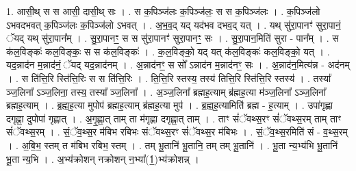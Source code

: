 \documentclass[17pt]{extarticle}
\begin{document}
1. आसी॒थ् स स आसी॒ दासी॒थ् सः । . स क॒पिञ्ज॑लः क॒पिञ्ज॑लः॒ स स क॒पिञ्ज॑लः । . क॒पिञ्ज॑लो ऽभवदभवत् क॒पिञ्ज॑लः क॒पिञ्ज॑लो ऽभवत् । . अ॒भ॒व॒द् यद् यद॑भव दभव॒द् यत् । . यथ् सु॑रा॒पानꣳ॑ सुरा॒पानं॒ ॅयद् यथ् सु॑रा॒पान᳚म् । . सु॒रा॒पानꣳ॒॒ स स सु॑रा॒पानꣳ॑ सुरा॒पानꣳ॒॒ सः । . सु॒रा॒पान॒मिति॑ सुरा - पान᳚म् । . स क॑ल॒विङ्कः॑ कल॒विङ्कः॒ स स क॑ल॒विङ्कः॑ । . क॒ल॒विङ्को॒ यद् यत् क॑ल॒विङ्कः॑ कल॒विङ्को॒ यत् । . यद॒न्नाद॑न म॒न्नाद॑नं॒ ॅयद् यद॒न्नाद॑नम् । . अ॒न्नाद॑नꣳ॒॒ स सो᳚ ऽन्नाद॑न म॒न्नाद॑नꣳ॒॒ सः । . अ॒न्नाद॑न॒मित्य॑न्न - अद॑नम् । . स ति॑त्ति॒रि स्ति॑त्ति॒रिः स स ति॑त्ति॒रिः । . ति॒त्ति॒रि स्तस्य॒ तस्य॑ तित्ति॒रि स्ति॑त्ति॒रि स्तस्य॑ । . तस्या᳚ ञ्ज॒लिना᳚ ऽञ्ज॒लिना॒ तस्य॒ तस्या᳚ ञ्ज॒लिना᳚ । . अ॒ञ्ज॒लिना᳚ ब्रह्मह॒त्याम् ब्र॑ह्मह॒त्या म॑ञ्ज॒लिना᳚ ऽञ्ज॒लिना᳚ ब्रह्मह॒त्याम् । . ब्र॒ह्म॒ह॒त्या मुपोप॑ ब्रह्मह॒त्याम् ब्र॑ह्मह॒त्या मुप॑ । . ब्र॒ह्म॒ह॒त्यामिति॑ ब्रह्म - ह॒त्याम् । . उपा॑गृह्णा दगृह्णा॒ दुपोपा॑ गृह्णात् । . अ॒गृ॒ह्णा॒त् ताम् ता म॑गृह्णा दगृह्णा॒त् ताम् । . ताꣳ सं॑ॅवथ्स॒रꣳ सं॑ॅवथ्स॒रम् ताम् ताꣳ सं॑ॅवथ्स॒रम् । . सं॒ॅव॒थ्स॒र म॑बिभ रबिभः संॅवथ्स॒रꣳ सं॑ॅवथ्स॒र म॑बिभः । . सं॒ॅव॒थ्स॒रमिति॑ सं - व॒थ्स॒रम् । . अ॒बि॒भ॒ स्तम् त म॑बिभ रबिभ॒ स्तम् । . तम् भू॒तानि॑ भू॒तानि॒ तम् तम् भू॒तानि॑ । . भू॒ता न्य॒भ्य॑भि भू॒तानि॑ भू॒ता न्य॒भि । . अ॒भ्य॑क्रोशन् नक्रोशन् न॒भ्या᳚(1॒)भ्य॑क्रोशन्न् । \newline
\end{document}
